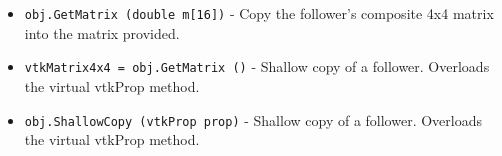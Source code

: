 \begin{itemize}
\item  \verb|obj.GetMatrix (double m[16])| -  Copy the follower's composite 4x4 matrix into the matrix provided.

\item  \verb|vtkMatrix4x4 = obj.GetMatrix ()| -  Shallow copy of a follower. Overloads the virtual vtkProp method.

\item  \verb|obj.ShallowCopy (vtkProp prop)| -  Shallow copy of a follower. Overloads the virtual vtkProp method.

\end{itemize}
